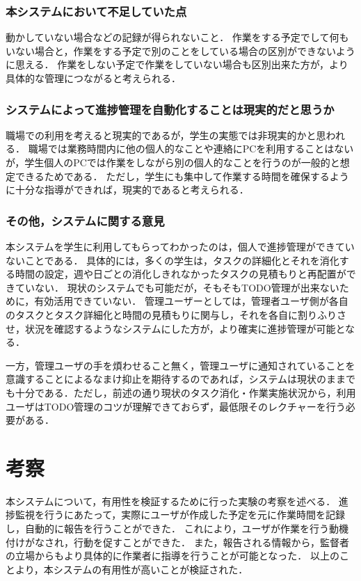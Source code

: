\subsubsection{本システムにおいて不足していた点}
動かしていない場合などの記録が得られないこと．
作業をする予定でして何もいない場合と，作業をする予定で別のことをしている場合の区別ができないように思える．
作業をしない予定で作業をしていない場合も区別出来た方が，より具体的な管理につながると考えられる．

\subsubsection{システムによって進捗管理を自動化することは現実的だと思うか}
職場での利用を考えると現実的であるが，学生の実態では非現実的かと思われる．
職場では業務時間内に他の個人的なことや連絡にPCを利用することはないが，学生個人のPCでは作業をしながら別の個人的なことを行うのが一般的と想定できるためである．
ただし，学生にも集中して作業する時間を確保するように十分な指導ができれば，現実的であると考えられる．

\subsubsection{その他，システムに関する意見}
本システムを学生に利用してもらってわかったのは，個人で進捗管理ができていないことである．
具体的には，多くの学生は，タスクの詳細化とそれを消化する時間の設定，週や日ごとの消化しきれなかったタスクの見積もりと再配置ができていない．
現状のシステムでも可能だが，そもそもTODO管理が出来ないために，有効活用できていない．
管理ユーザーとしては，管理者ユーザ側が各自のタスクとタスク詳細化と時間の見積もりに関与し，それを各自に割りふりさせ，状況を確認するようなシステムにした方が，より確実に進捗管理が可能となる．

一方，管理ユーザの手を煩わせること無く，管理ユーザに通知されていることを意識することによるなまけ抑止を期待するのであれば，システムは現状のままでも十分である．ただし，前述の通り現状のタスク消化・作業実施状況から，利用ユーザはTODO管理のコツが理解できておらず，最低限そのレクチャーを行う必要がある．

\section{考察}
本システムについて，有用性を検証するために行った実験の考察を述べる．
進捗監視を行うにあたって，実際にユーザが作成した予定を元に作業時間を記録し，自動的に報告を行うことができた．
これにより，ユーザが作業を行う動機付けがなされ，行動を促すことができた．
また，報告される情報から，監督者の立場からもより具体的に作業者に指導を行うことが可能となった．
以上のことより，本システムの有用性が高いことが検証された．
